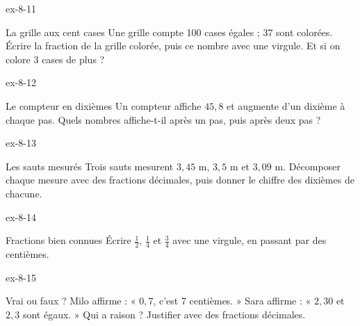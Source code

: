 \begin{blocLivre}{ex-8-11}\begin{exercice}[3]{La grille aux cent cases}
Une grille compte 100 cases égales ; 37 sont colorées. Écrire la fraction de la grille colorée, puis ce nombre avec une virgule. Et si on colore 3 cases de plus ?
\label{fig-ex-8-11}
\end{exercice}\end{blocLivre}
\begin{blocLivre}{ex-8-12}\begin{exercice}[3]{Le compteur en dixièmes}
Un compteur affiche $45{,}8$ et augmente d’un dixième à chaque pas. Quels nombres affiche-t-il après un pas, puis après deux pas ?
\end{exercice}\end{blocLivre}
\begin{blocLivre}{ex-8-13}\begin{exercice}[3]{Les sauts mesurés}
Trois sauts mesurent $3{,}45$ m, $3{,}5$ m et $3{,}09$ m. Décomposer chaque mesure avec des fractions décimales, puis donner le chiffre des dixièmes de chacune.
\end{exercice}\end{blocLivre}
\begin{blocLivre}{ex-8-14}\begin{exercice}[3]{Fractions bien connues}
Écrire $\frac12$, $\frac14$ et $\frac34$ avec une virgule, en passant par des centièmes.
\end{exercice}\end{blocLivre}
\begin{blocLivre}{ex-8-15}\begin{exercice}[3]{Vrai ou faux ?}
Milo affirme : « $0{,}7$, c’est 7 centièmes. » Sara affirme : « $2{,}30$ et $2{,}3$ sont égaux. » Qui a raison ? Justifier avec des fractions décimales.
\end{exercice}\end{blocLivre}

\clearpage
